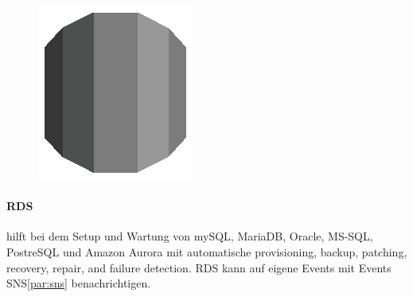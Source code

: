 \documentclass[
12pt,
english,
ngerman,
headsepline,
twoside,
openright,
numbers=noenddot,version=first
]{scrreprt}
\begin{document}
\begin{figure}
	\includegraphics[width=0.9\linewidth]{./pics/aws/Database_GRAYSCALE_AmazonRDS.eps}
\end{figure}
\paragraph{\acrfull{RDS}} hilft bei dem Setup und Wartung von mySQL, MariaDB, Oracle, MS-SQL, PostreSQL und Amazon Aurora mit automatische provisioning, backup, patching, recovery, repair, and failure detection. RDS kann auf eigene Events mit Events SNS\ref{par:sns} benachrichtigen.
\end{document}
